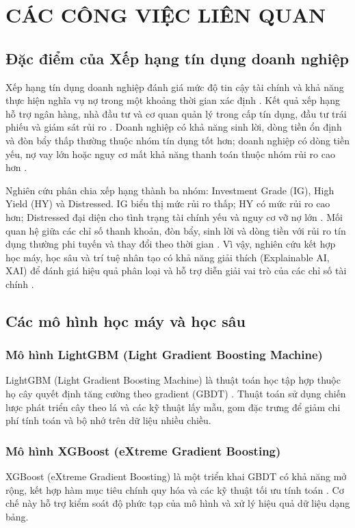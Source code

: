 \documentclass[10pt,twoside]{article}
\begin{document}
\section{CÁC CÔNG VIỆC LIÊN QUAN}

\subsection{Đặc điểm của Xếp hạng tín dụng doanh nghiệp}

Xếp hạng tín dụng doanh nghiệp đánh giá mức độ tin cậy tài chính và khả năng thực hiện nghĩa vụ nợ trong một khoảng thời gian xác định \cite{phu_nghi_nodate}. Kết quả xếp hạng hỗ trợ ngân hàng, nhà đầu tư và cơ quan quản lý trong cấp tín dụng, đầu tư trái phiếu và giám sát rủi ro \cite{hai_mo_2023}. Doanh nghiệp có khả năng sinh lời, dòng tiền ổn định và đòn bẩy thấp thường thuộc nhóm tín dụng tốt hơn; doanh nghiệp có dòng tiền yếu, nợ vay lớn hoặc nguy cơ mất khả năng thanh toán thuộc nhóm rủi ro cao hơn \cite{thuy_ung_2023}.

Nghiên cứu phân chia xếp hạng thành ba nhóm: Investment Grade (IG), High Yield (HY) và Distressed. IG biểu thị mức rủi ro thấp; HY có mức rủi ro cao hơn; Distressed đại diện cho tình trạng tài chính yếu và nguy cơ vỡ nợ lớn \cite{hung_xep_2023}. Mối quan hệ giữa các chỉ số thanh khoản, đòn bẩy, sinh lời và dòng tiền với rủi ro tín dụng thường phi tuyến và thay đổi theo thời gian \cite{hai_mo_2023}. Vì vậy, nghiên cứu kết hợp học máy, học sâu và trí tuệ nhân tạo có khả năng giải thích (Explainable AI, XAI) để đánh giá hiệu quả phân loại và hỗ trợ diễn giải vai trò của các chỉ số tài chính \cite{gramegna_shap_2021}.
\subsection{Các mô hình học máy và học sâu}

\subsubsection{Mô hình LightGBM (Light Gradient Boosting Machine)}
LightGBM (Light Gradient Boosting Machine) là thuật toán học tập hợp thuộc họ cây quyết định tăng cường theo gradient (GBDT) \cite{ke_lightgbm_2017}. Thuật toán sử dụng chiến lược phát triển cây theo lá và các kỹ thuật lấy mẫu, gom đặc trưng để giảm chi phí tính toán và bộ nhớ trên dữ liệu nhiều chiều.
\subsubsection{Mô hình XGBoost (eXtreme Gradient Boosting)}
XGBoost (eXtreme Gradient Boosting) là một triển khai GBDT có khả năng mở rộng, kết hợp hàm mục tiêu chính quy hóa và các kỹ thuật tối ưu tính toán \cite{chen_xgboost_2016}. Cơ chế này hỗ trợ kiểm soát độ phức tạp của mô hình và xử lý hiệu quả dữ liệu dạng bảng.
\end{document}
